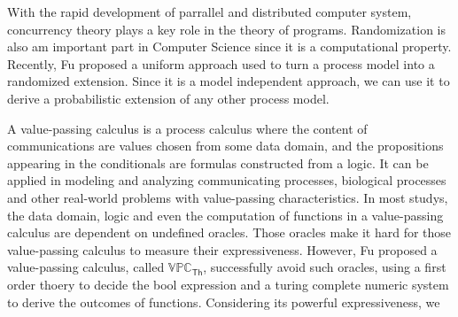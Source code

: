 
\begin{digest}
  With the rapid development of parrallel and distributed computer system,
  concurrency theory plays a key role in the theory of programs.
  Randomization is also am important part in Computer Science since it is a computational property. 
  Recently, Fu proposed a uniform approach
  used to turn a process model into a randomized extension.
  Since it is a model independent approach,
  we can use it to derive a probabilistic extension of 
  any other process model.

  A value-passing calculus is a process calculus where the content of communications are values chosen from some data domain,
  and the propositions appearing in the conditionals are formulas constructed from a logic.
  It can be applied in modeling and analyzing communicating processes,
  biological processes and other real-world problems with value-passing characteristics.
  In most studys, the data domain, logic and even the computation of functions in a value-passing calculus are dependent on undefined oracles.
  Those oracles make it hard for those value-passing calculus to measure their expressiveness.
  However,
  Fu proposed a value-passing calculus, called $\mathbb{VPC}_{\mathsf{Th}}$, successfully avoid such oracles, 
  using a first order thoery to decide the bool expression and a turing complete numeric system to derive the outcomes of functions.
  Considering its powerful expressiveness,
  we 


\end{digest}
